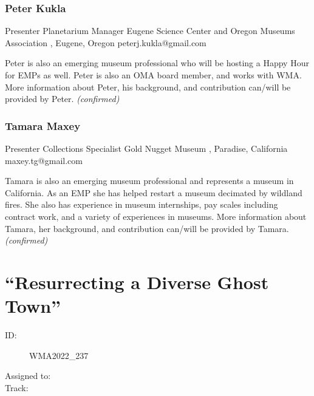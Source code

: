 \documentclass{report}
\begin{document}
              

              
                \subsubsection*{ Peter Kukla }
                Presenter\newline
                Planetarium Manager\newline
                Eugene Science Center and Oregon Museums Association , Eugene, Oregon
                \newline
                peterj.kukla@gmail.com\newline
                
                

                Peter is also an emerging museum professional who will be hosting a Happy Hour for EMPs as well. Peter is also an OMA board member, and works with WMA. More information about Peter, his background, and contribution can/will be provided by Peter.
                \emph{ (confirmed) }
              

              
                \subsubsection*{ Tamara  Maxey }
                Presenter\newline
                Collections Specialist\newline
                Gold Nugget Museum , Paradise, California
                \newline
                maxey.tg@gmail.com\newline
                
                

                Tamara is also an emerging museum professional and represents a museum in California. As an EMP she has helped restart a museum decimated by wildland fires. She also has experience in museum internships, pay scales including contract work, and a variety of experiences in museums.  More information about Tamara, her background, and contribution can/will be provided by Tamara.
                \emph{ (confirmed) }
              

              

              
        
          \newpage
          \section{ “Resurrecting a Diverse Ghost Town” }
            \begin{description}
              \item [ID:]
              WMA2022\_237

              \item [Assigned to:]
                \item [Track:]
              \end{description}
\end{document}
